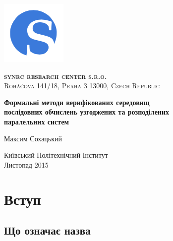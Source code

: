 \documentclass[11pt,oneside]{article}
\begin{document}
\thispagestyle{empty}
\begin{center}

\begin{minipage}[t]{2cm}
    \includegraphics[scale=0.4]{img/S}
\end{minipage}
\begin{minipage}[t]{12cm}
    \begin{flushright}
        \textsc{{\Large {\bf {\color{Blue}syn}{\color{OrangeRed}rc} research center s.r.o.}}}\\
        \textsc{Roháčova 141/18, Praha 3 13000, Czech Republic}\\
    \end{flushright}
\end{minipage}

\vspace{3cm}

    \vspace{3cm}   {\Large \bf Формальні методи верифікованих середовищ \\
                                  послідовних обчислень узгоджених та розподілених \\
                                  паралельних систем\par}
    \vspace{3cm}   {\Large Максим Сохацький\par}
    \vspace{6cm}   {\Large Київський Політехнічний Інститут\\}
    \vspace{0.3cm} {\Large Листопад 2015}
\end{center}

\vspace{2cm}
\newpage
\section{Вступ}

\vspace{1cm}

\subsection{Що означає назва}
\end{document}
